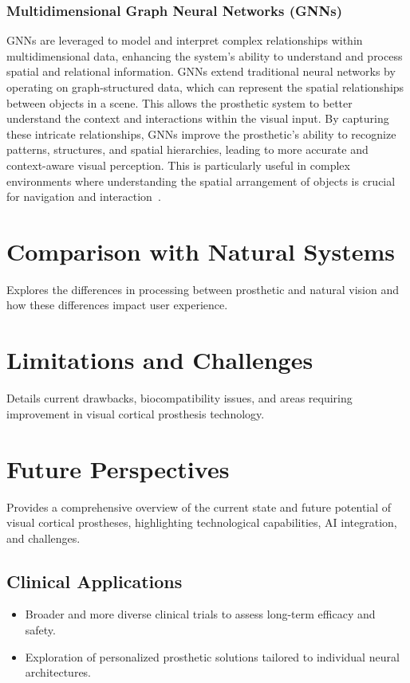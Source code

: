 \documentclass[twocolumn,10pt]{article}
\begin{document}
\subsubsection*{Multidimensional Graph Neural Networks (GNNs)}
GNNs are leveraged to model and interpret complex relationships within
multidimensional data, enhancing the system's ability to understand and process
spatial and relational information. GNNs extend traditional neural networks by
operating on graph-structured data, which can represent the spatial
relationships between objects in a scene. This allows the prosthetic system to
better understand the context and interactions within the visual input. By
capturing these intricate relationships, GNNs improve the prosthetic's ability
to recognize patterns, structures, and spatial hierarchies, leading to more
accurate and context-aware visual perception. This is particularly useful in
complex environments where understanding the spatial arrangement of objects is
crucial for navigation and
interaction~\cite{subramanianGraphConvolutionalNetworks2020,wuComprehensiveSurveyGraph2021}.

\section{Comparison with Natural Systems}\label{sec:comparison}
Explores the differences in processing between prosthetic and natural vision and
how these differences impact user experience.

\section{Limitations and Challenges}\label{sec:limitations}
Details current drawbacks, biocompatibility issues, and areas requiring
improvement in visual cortical prosthesis technology.

\section{Future Perspectives}\label{sec:future}
Provides a comprehensive overview of the current state and future potential of
visual cortical prostheses, highlighting technological capabilities, AI
integration, and challenges.

\subsection{Clinical Applications}
\begin{itemize}
      \item Broader and more diverse clinical trials to assess long-term efficacy
            and safety.
      \item Exploration of personalized prosthetic solutions tailored to
            individual neural architectures.
\end{itemize}
\end{document}
